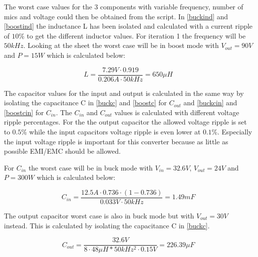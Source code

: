 The worst case values for the 3 components with variable frequency, number of mics and voltage could then be obtained from the script. 
In \ref{buckind} and \ref{boostind} the inductance L has been isolated and calculated with a current ripple of $10\%$ to get the different inductor values. For iteration 1 the frequency will be $50kHz$. Looking at the sheet the worst case will be in boost mode with $V_{out}=90V$ and $P=15W$ which is calculated below:

\begin{equation}\label{buckind}
L = \frac{7.29V\cdot 0.919}{0.206A\cdot 50kHz} = 650\mu H
\end{equation} 

The capacitor values for the input and output is calculated in the same way by isolating the capacitance C in \ref{buckc} and \ref{boostc} for $C_{out}$ and \ref{buckcin} and \ref{boostcin} for $C_{in}$.
The $C_{in}$ and $C_{out}$ values is calculated with different voltage ripple percentages. For the the output capacitor the allowed voltage ripple is set to $0.5\%$ while the input capacitors voltage ripple is even lower at $0.1\%$. Especially the input voltage ripple is important for this converter because as little as possible EMI/EMC should be allowed. 

For $C_{in}$ the worst case will be in buck mode with $V_{in}=32.6V$, $V_{out}=24V$ and $P=300W$ which is calculated below:

\begin{equation}
C_{in} = \frac{12.5A\cdot 0.736\cdot (1-0.736)}{0.033V\cdot 50kHz} = 1.49mF
\end{equation}    

The output capacitor worst case is also in buck mode but with $V_{out}=30V$ instead. This is calculated by isolating the capacitance C in \ref{buckc}. 

\begin{equation} \label{buckc} 
C_{out} = \frac{32.6V}{8\cdot 48\mu H*50kHz^2\cdot 0.15V} = 226.39\mu F
\end{equation}
   

